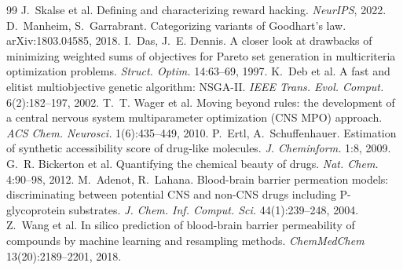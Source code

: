 \documentclass[10pt,letterpaper]{article}
\begin{document}
\begin{thebibliography}{99}
 J.~Skalse et al. Defining and characterizing reward hacking. \emph{NeurIPS}, 2022.
 D.~Manheim, S.~Garrabrant. Categorizing variants of Goodhart's law. arXiv:1803.04585, 2018.
 I.~Das, J.~E. Dennis. A closer look at drawbacks of minimizing weighted sums of objectives for Pareto set generation in multicriteria optimization problems. \emph{Struct. Optim.} 14:63--69, 1997.
 K.~Deb et al. A fast and elitist multiobjective genetic algorithm: NSGA-II. \emph{IEEE Trans. Evol. Comput.} 6(2):182--197, 2002.
 T.~T. Wager et al. Moving beyond rules: the development of a central nervous system multiparameter optimization (CNS MPO) approach. \emph{ACS Chem. Neurosci.} 1(6):435--449, 2010.
 P.~Ertl, A.~Schuffenhauer. Estimation of synthetic accessibility score of drug-like molecules. \emph{J. Cheminform.} 1:8, 2009.
 G.~R. Bickerton et al. Quantifying the chemical beauty of drugs. \emph{Nat. Chem.} 4:90--98, 2012.
 M.~Adenot, R.~Lahana. Blood-brain barrier permeation models: discriminating between potential CNS and non-CNS drugs including P-glycoprotein substrates. \emph{J. Chem. Inf. Comput. Sci.} 44(1):239--248, 2004.
 Z.~Wang et al. In silico prediction of blood-brain barrier permeability of compounds by machine learning and resampling methods. \emph{ChemMedChem} 13(20):2189--2201, 2018.
\end{thebibliography}
\end{document}

